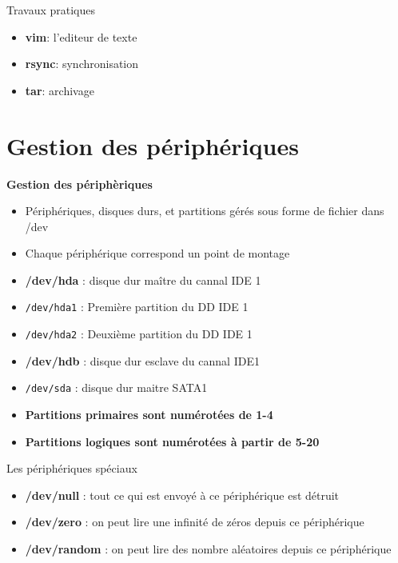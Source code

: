 \documentclass[french]{beamer}
\begin{document}
\begin{frame}
\begin{center}
Travaux pratiques
\begin{itemize}
\item \textbf{vim}: l'editeur de texte
\item \textbf{rsync}: synchronisation
\item \textbf{tar}: archivage
\end{itemize}
\end{center}
\end{frame}


\section{Gestion des périphériques}
\frame{\tableofcontents[current]}

\begin{frame}
\begin{center}
\textbf{Gestion des périphèriques}
\end{center}
\begin{itemize}
\item Périphériques, disques durs, et partitions gérés sous forme de fichier dans /dev
\item Chaque périphérique correspond un point de montage
\item \textbf{/dev/hda} : disque dur maître du cannal IDE 1
\item \texttt{/dev/hda1} : Première partition du DD IDE 1
\item \texttt{/dev/hda2} : Deuxième partition du DD IDE 1
\item \textbf{/dev/hdb} : disque dur esclave du cannal IDE1
\item \texttt{/dev/sda} : disque dur maitre SATA1
\item \textbf{Partitions primaires sont numérotées de 1-4}
\item \textbf{Partitions logiques sont numérotées à partir de 5-20}
\end{itemize}
\end{frame}

\begin{frame}
Les périphériques spéciaux
	\begin{itemize}
	\item \textbf{/dev/null} : tout ce qui est envoyé à ce périphérique est détruit
	\item \textbf{/dev/zero} : on peut lire une infinité de zéros depuis ce périphérique
	\item \textbf{/dev/random} : on peut lire des nombre aléatoires depuis ce périphérique
	\end{itemize}
\end{frame}
\end{document}
